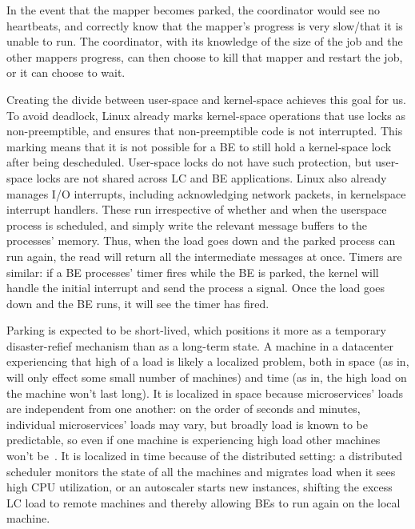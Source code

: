 In the event that the mapper becomes parked, the coordinator would see no
heartbeats, and correctly know that the mapper's progress is very slow/that it
is unable to run. The coordinator, with its knowledge of the size of the job and
the other mappers progress, can then choose to kill that mapper and restart the
job, or it can choose to wait.


Creating the divide between user-space and kernel-space achieves this goal for
us. To avoid deadlock, Linux already marks kernel-space operations that use
locks as non-preemptible, and ensures that non-preemptible code is not
interrupted. This marking means that it is not possible for a BE to still hold a
kernel-space lock after being descheduled. User-space locks do not have such
protection, but user-space locks are not shared across LC and BE applications.
Linux also already manages I/O interrupts, including acknowledging network
packets, in kernelspace interrupt handlers. These run irrespective of whether
and when the userspace process is scheduled, and simply write the relevant
message buffers to the processes' memory. Thus, when the load goes down and the
parked process can run again, the read will return all the intermediate messages
at once. Timers are similar: if a BE processes' timer fires while the BE is
parked, the kernel will handle the initial interrupt and send the process a
signal. Once the load goes down and the BE runs, it will see the timer has
fired.

Parking is expected to be short-lived, which positions it more as a temporary
disaster-refief mechanism than as a long-term state. A machine in a datacenter experiencing that high of a load is likely
a localized problem, both in space (as in, will only effect some small number of
machines) and time (as in, the high load on the machine won't last long). It is
localized in space because microservices' loads are independent from one
another: on the order of seconds and minutes, individual microservices' loads
may vary, but broadly load is known to be predictable, so even if one machine is
experiencing high load other machines won't be~\cite{TODO}. It is localized in
time because of the distributed setting: a distributed scheduler monitors the
state of all the machines and migrates load when it sees high CPU utilization,
or an autoscaler starts new instances, shifting the excess LC load to remote
machines and thereby allowing BEs to run again on the local machine.